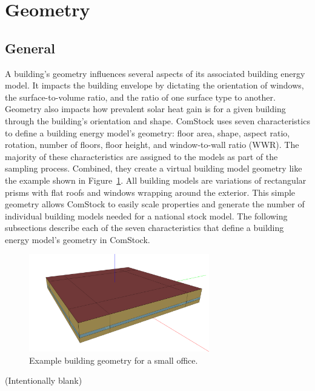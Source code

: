 \section{Geometry}
\subsection{General}
A building's geometry influences several aspects of its associated building energy model. It impacts the building envelope by dictating the orientation of windows, the surface-to-volume ratio, and the ratio of one surface type to another. Geometry also impacts how prevalent solar heat gain is for a given building through the building's orientation and shape. ComStock uses seven characteristics to define a building energy model's geometry: floor area, shape, aspect ratio, rotation, number of floors, floor height, and window-to-wall ratio (WWR). The majority of these characteristics are assigned to the models as part of the sampling process. Combined, they create a virtual building model geometry like the example shown in Figure~\ref{fig:geom_example}. All building models are variations of rectangular prisms with flat roofs and windows wrapping around the exterior. This simple geometry allows ComStock to easily scale properties and generate the number of individual building models needed for a national stock model. The following subsections describe each of the seven characteristics that define a building energy model's geometry in ComStock.

\begin{figure}[h!]
    \centering \includegraphics[width=0.7\textwidth]{figures/small_office_geometry.PNG}
    \caption[Example building geometry for a small office]{Example building geometry for a small office.}
    \label{fig:geom_example}
\end{figure}

\vspace{40mm} %
\begin{center}
 (Intentionally blank)   
\end{center}


